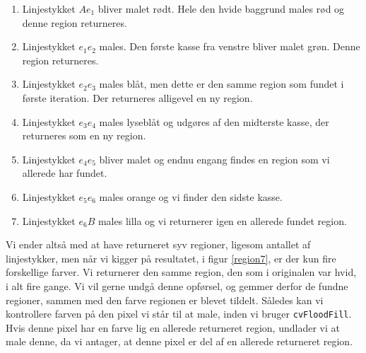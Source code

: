 {\begin{enumerate}
    \item Linjestykket $Ae_1$ bliver malet rødt. Hele den hvide baggrund
        males rød og denne region returneres.
    \item Linjestykket $e_1e_2$ males. Den første kasse fra venstre
        bliver malet grøn. Denne region returneres.
    \item Linjestykket $e_2e_3$ males blåt, men dette er den samme region som
        fundet i første iteration. Der returneres alligevel en ny
        region.
    \item Linjestykket $e_3e_4$ males lyseblåt og udgøres af den
        midterste kasse, der returneres som en ny region.
    \item Linjestykket $e_4e_5$ bliver malet og endnu engang findes en
        region som vi allerede har fundet.
    \item Linjestykket $e_5e_6$ males orange og vi finder den sidste
        kasse.
    \item Linjestykket $e_6B$ males lilla og vi returnerer igen en
        allerede fundet region.
\end{enumerate}
Vi ender altså med at have returneret syv regioner, ligesom antallet af
linjestykker, men når vi kigger på resultatet, i figur \ref{region7}, er
der kun fire forskellige farver. Vi returnerer den samme region, den som
i originalen var hvid, i alt fire gange. Vi vil gerne undgå denne
opførsel, og gemmer derfor de fundne regioner, sammen med den farve
regionen er blevet tildelt. Således kan vi kontrollere farven på den
pixel vi står til at male, inden vi bruger \texttt{cvFloodFill}. Hvis
denne pixel har en farve lig en allerede returneret region, undlader vi
at male denne, da vi antager, at denne pixel er del af en allerede
returneret region.

}
